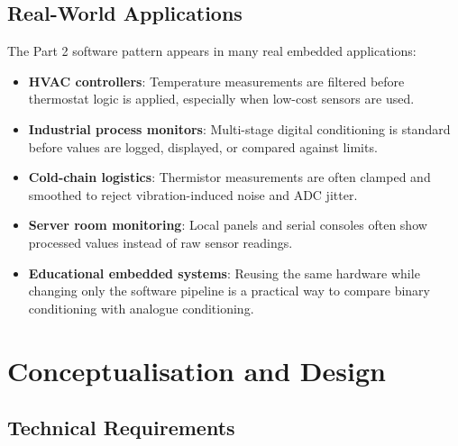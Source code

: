\documentclass[12pt]{article}
\begin{document}
\subsection{Real-World Applications}
\hspace{0.8cm} The Part 2 software pattern appears in many real embedded applications:

\begin{itemize}
    \item \textbf{HVAC controllers}: Temperature measurements are filtered before thermostat logic is applied, especially when low-cost sensors are used.
    \item \textbf{Industrial process monitors}: Multi-stage digital conditioning is standard before values are logged, displayed, or compared against limits.
    \item \textbf{Cold-chain logistics}: Thermistor measurements are often clamped and smoothed to reject vibration-induced noise and ADC jitter.
    \item \textbf{Server room monitoring}: Local panels and serial consoles often show processed values instead of raw sensor readings.
    \item \textbf{Educational embedded systems}: Reusing the same hardware while changing only the software pipeline is a practical way to compare binary conditioning with analogue conditioning.
\end{itemize}

\section{Conceptualisation and Design}

\subsection{Technical Requirements}
\end{document}
